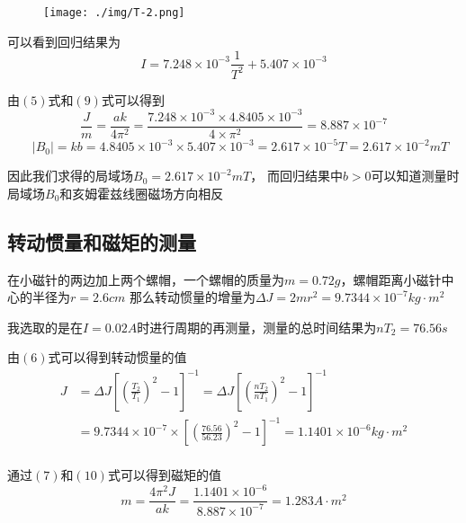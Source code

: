 \documentclass{article}
\begin{document}
\begin{figure}[H]
    \centering
    \texttt{[image: ./img/T-2.png]}
\end{figure}

可以看到回归结果为$$I=7.248\times 10^{-3}\frac{1}{T^2}+5.407\times 10^{-3}$$

由$(5)$式和$(9)$式可以得到
\begin{equation}
    \frac{J}{m}=\frac{ak}{4\pi ^2}=\frac{7.248\times 10^{-3}\times 4.8405\times 10^{-3}}{4\times \pi^2}=8.887\times 10^{-7}
\end{equation}
\begin{equation}
    \quad |B_0|=kb=4.8405\times 10^{-3}\times 5.407\times 10^{-3}=2.617\times 10^{-5}T=2.617 \times 10^{-2}mT
\end{equation}

因此我们求得的局域场$B_0=2.617\times 10^{-2}mT$，
而回归结果中$b>0$可以知道测量时局域场$B_0$和亥姆霍兹线圈磁场方向相反

\subsection{转动惯量和磁矩的测量}
在小磁针的两边加上两个螺帽，一个螺帽的质量为$m=0.72g$，螺帽距离小磁针中心的半径为$r=2.6cm$
那么转动惯量的增量为$\Delta J=2mr^2=9.7344\times 10^{-7}kg\cdot m^2$

我选取的是在$I=0.02A$时进行周期的再测量，测量的总时间结果为$nT_2=76.56s$

由$(6)$式可以得到转动惯量的值
\begin{align*}
    J&=\Delta J[(\frac{T_2}{T_1})^2-1]^{-1}=\Delta J[(\frac{nT_2}{nT_1})^2-1]^{-1} \\
    &=9.7344\times 10^{-7}\times [(\frac{76.56}{56.23})^2-1]^{-1}=1.1401\times 10^{-6}kg\cdot m^2\\
\end{align*}

通过$(7)$和$(10)$式可以得到磁矩的值
$$m=\frac{4\pi ^2J}{ak}=\frac{1.1401\times 10^{-6}}{8.887\times 10^{-7}}=1.283A\cdot m^2$$
\end{document}
